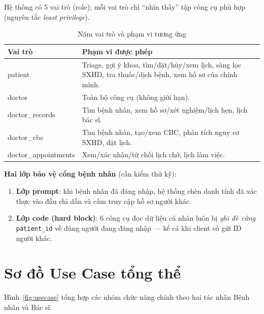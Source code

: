 \documentclass[a4paper,12pt]{article}
\begin{document}
Hệ thống có 5 vai trò (role); mỗi vai trò chỉ ``nhìn thấy'' tập công cụ phù hợp (nguyên tắc \textit{least privilege}).

\begin{table}[H]
\centering
\begin{tabular}{|>{\raggedright\arraybackslash}p{3.6cm}|p{9.5cm}|}
\hline
\textbf{Vai trò} & \textbf{Phạm vi được phép} \\
\hline
patient               & Triage, gợi ý khoa, tìm/đặt/hủy/xem lịch, sàng lọc SXHD, tra thuốc/dịch bệnh, xem hồ sơ của chính mình. \\ \hline
doctor                & Toàn bộ công cụ (không giới hạn). \\ \hline
doctor\_records       & Tìm bệnh nhân, xem hồ sơ/xét nghiệm/lịch hẹn, lịch bác sĩ. \\ \hline
doctor\_cbc           & Tìm bệnh nhân, tạo/xem CBC, phân tích nguy cơ SXHD, đặt lịch. \\ \hline
doctor\_appointments  & Xem/xác nhận/từ chối lịch chờ, lịch làm việc. \\ \hline
\end{tabular}
\caption{Năm vai trò và phạm vi tương ứng}
\end{table}

\noindent\textbf{Hai lớp bảo vệ cổng bệnh nhân} (cần kiểm thử kỹ):
\begin{enumerate}[leftmargin=1.6em]
  \item \textbf{Lớp prompt}: khi bệnh nhân đã đăng nhập, hệ thống chèn danh tính đã xác thực vào đầu chỉ dẫn và cấm truy cập hồ sơ người khác.
  \item \textbf{Lớp code (hard block)}: 6 công cụ đọc dữ liệu cá nhân luôn bị \textit{ghi đè cứng} \texttt{patient\_id} về đúng người đang đăng nhập --- kể cả khi client cố gửi ID người khác.
\end{enumerate}

\section{Sơ đồ Use Case tổng thể}

Hình~\ref{fig:usecase} tổng hợp các nhóm chức năng chính theo hai tác nhân Bệnh nhân và Bác sĩ.
\end{document}
